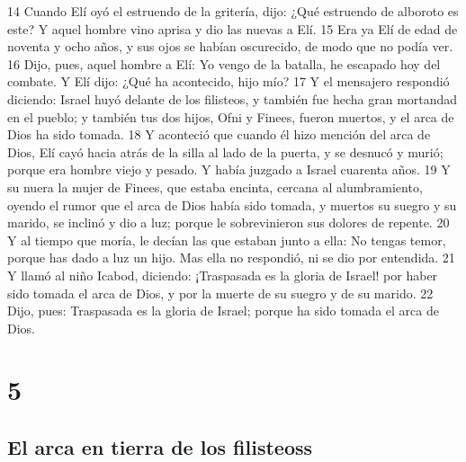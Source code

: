 14 Cuando Elí oyó el estruendo de la gritería, dijo: ¿Qué estruendo de alboroto es este? Y aquel hombre vino aprisa y dio las nuevas a Elí.
15 Era ya Elí de edad de noventa y ocho años, y sus ojos se habían oscurecido, de modo que no podía ver.
16 Dijo, pues, aquel hombre a Elí: Yo vengo de la batalla, he escapado hoy del combate. Y Elí dijo: ¿Qué ha acontecido, hijo mío?
17 Y el mensajero respondió diciendo: Israel huyó delante de los filisteos, y también fue hecha gran mortandad en el pueblo; y también tus dos hijos, Ofni y Finees, fueron muertos, y el arca de Dios ha sido tomada. 
18 Y aconteció que cuando él hizo mención del arca de Dios, Elí cayó hacia atrás de la silla al lado de la puerta, y se desnucó y murió; porque era hombre viejo y pesado. Y había juzgado a Israel cuarenta años.
19 Y su nuera la mujer de Finees, que estaba encinta, cercana al alumbramiento, oyendo el rumor que el arca de Dios había sido tomada, y muertos su suegro y su marido, se inclinó y dio a luz; porque le sobrevinieron sus dolores de repente.
20 Y al tiempo que moría, le decían las que estaban junto a ella: No tengas temor, porque has dado a luz un hijo. Mas ella no respondió, ni se dio por entendida.
21 Y llamó al niño Icabod, diciendo: ¡Traspasada es la gloria de Israel! por haber sido tomada el arca de Dios, y por la muerte de su suegro y de su marido.
22 Dijo, pues: Traspasada es la gloria de Israel; porque ha sido tomada el arca de Dios.

\chapter{5}

\section*{El arca en tierra de los filisteoss}


